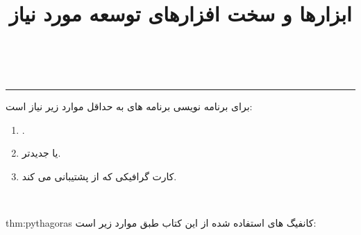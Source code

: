     \title{
        \LARGE
        \textbf{ابزارها و سخت افزارهای توسعه مورد نیاز}
    }
    \\ \rule{\textwidth}{0.5pt}
    {\large
    برای برنامه نویسی برنامه های  به حداقل موارد زیر نیاز است:
        \begin{enumerate}
            \item {.}
            \item { یا جدیدتر.}
            \item {کارت گرافیکی که از  پشتیبانی می کند.}
        \end{enumerate}
    }
    \\[25pt]
    \begin{theo}{thm:pythagoras}
        \large
        کانفیگ های استفاده شده از این کتاب طبق موارد زیر است:
    \end{theo}

